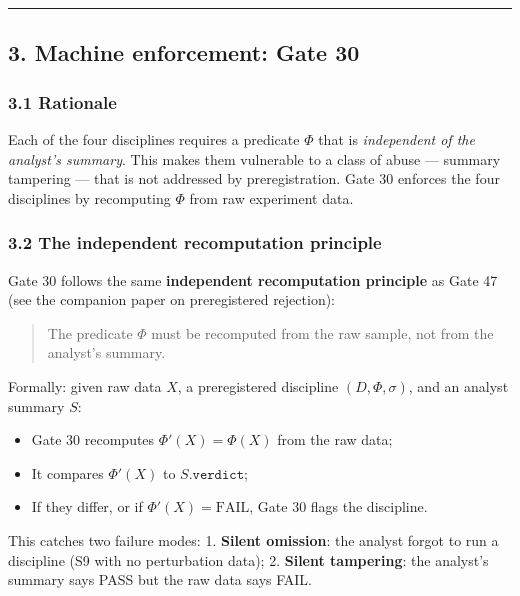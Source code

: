 \documentclass[
]{article}
\providecommand{\tightlist}{%
  \setlength{\itemsep}{0pt}\setlength{\parskip}{0pt}}
\begin{document}
\begin{center}\rule{0.5\linewidth}{0.5pt}\end{center}

\subsection{3. Machine enforcement: Gate
30}\label{machine-enforcement-gate-30}

\subsubsection{3.1 Rationale}\label{rationale}

Each of the four disciplines requires a predicate \(\Phi\) that is
\emph{independent of the analyst's summary}. This makes them vulnerable
to a class of abuse --- summary tampering --- that is not addressed by
preregistration. Gate 30 enforces the four disciplines by recomputing
\(\Phi\) from raw experiment data.

\subsubsection{3.2 The independent recomputation
principle}\label{the-independent-recomputation-principle}

Gate 30 follows the same \textbf{independent recomputation principle} as
Gate 47 (see the companion paper on preregistered rejection):

\begin{quote}
The predicate \(\Phi\) must be recomputed from the raw sample, not from
the analyst's summary.
\end{quote}

Formally: given raw data \(X\), a preregistered discipline
\((D, \Phi, \sigma)\), and an analyst summary \(S\):

\begin{itemize}
\tightlist
\item
  Gate 30 recomputes \(\Phi'(X) = \Phi(X)\) from the raw data;
\item
  It compares \(\Phi'(X)\) to \(S.\texttt{verdict}\);
\item
  If they differ, or if \(\Phi'(X) = \text{FAIL}\), Gate 30 flags the
  discipline.
\end{itemize}

This catches two failure modes: 1. \textbf{Silent omission}: the analyst
forgot to run a discipline (S9 with no perturbation data); 2.
\textbf{Silent tampering}: the analyst's summary says PASS but the raw
data says FAIL.
\end{document}
